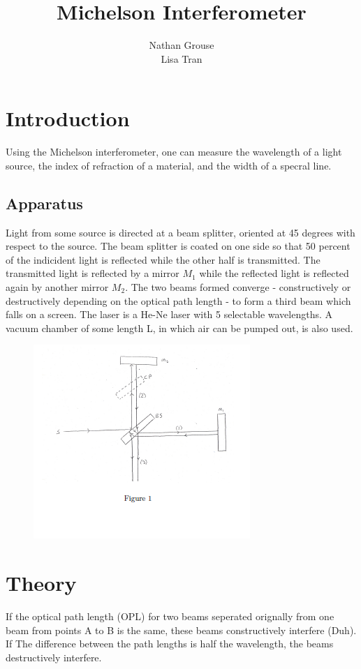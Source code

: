 \documentclass[12pt]{article}
\title{Michelson Interferometer}
\author{Nathan Grouse\\Lisa Tran}
\begin{document}
\maketitle

\section{Introduction}
\indent \indent Using the Michelson interferometer, one can measure the wavelength of a light source, the index of refraction of a material, and the width of a specral line.

\subsection{Apparatus}
\indent \indent Light from some source is directed at a beam splitter, oriented at 45 degrees with respect to the source. The beam splitter is coated on one side so that 50 percent of the indicident light is reflected while the other half is transmitted. The transmitted light is reflected by a mirror $M_1$ while the reflected light is reflected again by another mirror $M_2$. The two beams formed converge - constructively or destructively depending on the optical path length - to form a third beam which falls on a screen. The laser is a He-Ne laser with 5 selectable wavelengths. A vacuum chamber of some length L, in which air can be pumped out, is also used.

\begin{figure}[H]
\centering
\hspace{-0.0in}\includegraphics[scale=0.90]{apparatus.png}
\end{figure}

\section{Theory}
\indent \indent If the optical path length (OPL) for two beams seperated orignally from one beam from points A to B is the same, these beams constructively interfere (Duh). If The difference between the path lengths is half the wavelength, the beams destructively interfere. \\
\end{document}

